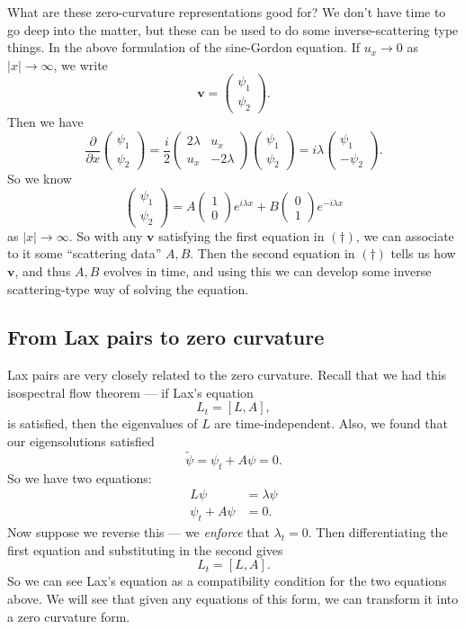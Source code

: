 \documentclass[a4paper]{article}
\begin{document}
What are these zero-curvature representations good for? We don't have time to go deep into the matter, but these can be used to do some inverse-scattering type things. In the above formulation of the sine-Gordon equation. If $u_x \to 0$ as $|x| \to \infty$, we write
\[
  \mathbf{v} =
  \begin{pmatrix}
    \psi_1\\
    \psi_2
  \end{pmatrix}.
\]
Then we have
\[
  \frac{\partial}{\partial x}
  \begin{pmatrix}
    \psi_1\\
    \psi_2
  \end{pmatrix}
  = \frac{i}{2}
  \begin{pmatrix}
    2\lambda & u_x\\
    u_x & -2\lambda
  \end{pmatrix}
  \begin{pmatrix}
    \psi_1\\
    \psi_2
  \end{pmatrix} = i\lambda
  \begin{pmatrix}
    \psi_1\\
    -\psi_2
  \end{pmatrix}.
\]
So we know
\[
  \begin{pmatrix}
    \psi_1\\
    \psi_2
  \end{pmatrix} =
  A
  \begin{pmatrix}
    1\\0
  \end{pmatrix}
  e^{i\lambda x} + B
  \begin{pmatrix}
    0 \\1
  \end{pmatrix}
  e^{-i\lambda x}
\]
as $|x| \to \infty$. So with any $\mathbf{v}$ satisfying the first equation in $(\dagger)$, we can associate to it some ``scattering data'' $A, B$. Then the second equation in $(\dagger)$ tells us how $\mathbf{v}$, and thus $A, B$ evolves in time, and using this we can develop some inverse scattering-type way of solving the equation.

\subsection{From Lax pairs to zero curvature}
Lax pairs are very closely related to the zero curvature. Recall that we had this isospectral flow theorem --- if Lax's equation
\[
  L_t = [L, A],
\]
is satisfied, then the eigenvalues of $L$ are time-independent. Also, we found that our eigensolutions satisfied
\[
  \tilde{\psi} = \psi_t + A \psi = 0.
\]
So we have two equations:
\begin{align*}
  L \psi &= \lambda \psi\\
  \psi_t + A \psi &= 0.
\end{align*}
Now suppose we reverse this --- we \emph{enforce} that $\lambda_t = 0$. Then differentiating the first equation and substituting in the second gives
\[
  L_t = [L, A].
\]
So we can see Lax's equation as a compatibility condition for the two equations above. We will see that given any equations of this form, we can transform it into a zero curvature form.
\end{document}

